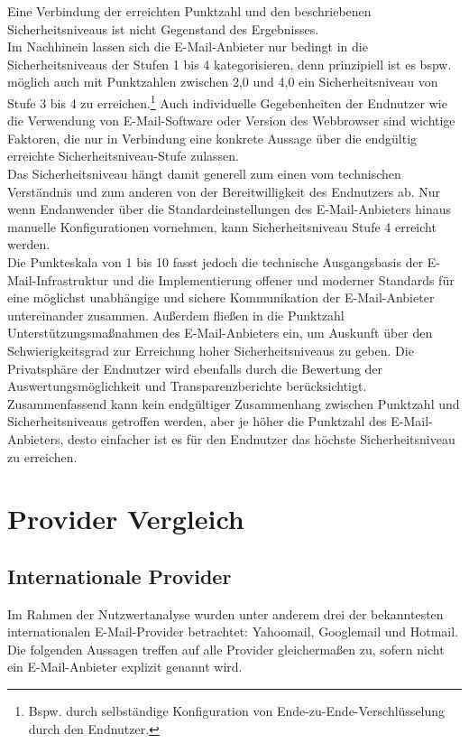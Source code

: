 \documentclass  [paper=a4,
				fontsize=12pt,
				listof=totoc,
				bibliography=totoc
				]{scrreprt}
\begin{document}
			Eine Verbindung der erreichten Punktzahl und den beschriebenen Sicherheitsniveaus ist nicht Gegenstand des Ergebnisses.\medskip\\
			Im Nachhinein lassen sich die E-Mail-Anbieter nur bedingt in die Sicherheitsniveaus der Stufen 1 bis 4 kategorisieren, denn prinzipiell ist es bspw. möglich auch mit Punktzahlen zwischen 2,0 und 4,0 ein Sicherheitsniveau von Stufe 3 bis 4 zu erreichen.\footnote{Bspw. durch selbständige Konfiguration von Ende-zu-Ende-Verschlüsselung durch den Endnutzer.}
			Auch individuelle Gegebenheiten der Endnutzer wie die Verwendung von E-Mail-Software oder Version des Webbrowser sind wichtige Faktoren, die nur in Verbindung eine konkrete Aussage über die endgültig erreichte Sicherheitsniveau-Stufe zulassen.\medskip\\
			Das Sicherheitsniveau hängt damit generell zum einen vom technischen Verständnis und zum anderen von der Bereitwilligkeit des Endnutzers ab. %
			Nur wenn Endanwender über die Standardeinstellungen des E-Mail-Anbieters hinaus manuelle Konfigurationen vornehmen, kann Sicherheitsniveau Stufe 4 erreicht werden.\medskip\\
			Die Punkteskala von 1 bis 10 fasst jedoch die technische Ausgangsbasis der E-Mail-Infrastruktur und die Implementierung offener und moderner Standards für eine möglichst unabhängige und sichere Kommunikation der E-Mail-Anbieter untereinander zusammen.
			Außerdem fließen in die Punktzahl Unterstützungsmaßnahmen des E-Mail-Anbieters ein, um Auskunft über den Schwierigkeitsgrad zur Erreichung hoher Sicherheitsniveaus zu geben.
			Die Privatsphäre der Endnutzer wird ebenfalls durch die Bewertung der Auswertungsmöglichkeit und Transparenzberichte berücksichtigt.\medskip\\
			Zusammenfassend kann kein endgültiger Zusammenhang zwischen Punktzahl und Sicherheitsniveaus getroffen werden, aber je höher die Punktzahl des E-Mail-Anbieters, desto einfacher ist es für den Endnutzer das höchste Sicherheitsniveau zu erreichen.
			
			
		
		\section{Provider Vergleich}\label{sec:provider-vergleich}
			\subsection{Internationale Provider}
			Im Rahmen der Nutzwertanalyse wurden unter anderem drei der bekanntesten internationalen E-Mail-Provider betrachtet: Yahoomail, Googlemail und Hotmail. Die folgenden Aussagen treffen auf alle Provider gleichermaßen zu, sofern nicht ein E-Mail-Anbieter explizit genannt wird.
			\medskip
			
\end{document}
